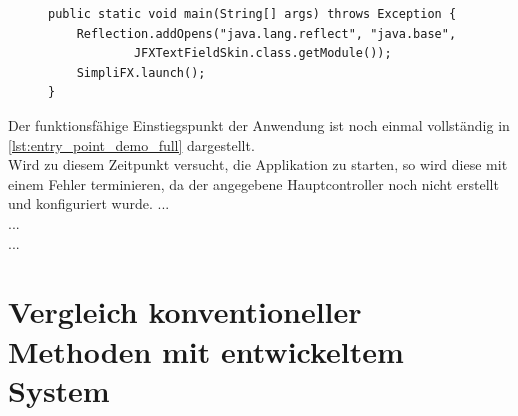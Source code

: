 \begin{figure}[H]
\begin{lstlisting}[caption=Demo -- \texttt{main} Methode., captionpos=b, label=lst:main_method_demo]
public static void main(String[] args) throws Exception {
    Reflection.addOpens("java.lang.reflect", "java.base",
			JFXTextFieldSkin.class.getModule());
    SimpliFX.launch();
}
	\end{lstlisting}
\end{figure}
\noindent Der funktionsfähige Einstiegspunkt der Anwendung ist noch einmal vollständig in \autoref{lst:entry_point_demo_full} dargestellt.\\
Wird zu diesem Zeitpunkt versucht, die Applikation zu starten, so wird diese mit einem Fehler terminieren, da der angegebene Hauptcontroller noch nicht erstellt und konfiguriert wurde.
\noindent...\\
...\\
...\\
\section{Vergleich konventioneller Methoden mit entwickeltem System}
\label{vergleich_system_javafx}

